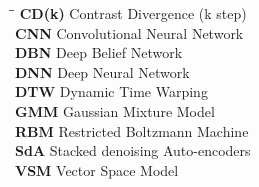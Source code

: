 \abbreviations
 
\noindent 
\begin{tabbing}
\hspace*{4cm}\=\hspace*{6cm}\= \kill
\textbf{CD(k)} \> Contrast Divergence (k step)\\
\textbf{CNN}   \> Convolutional Neural Network \\
\textbf{DBN}   \> Deep Belief Network \\
\textbf{DNN}   \> Deep Neural Network \\
\textbf{DTW}   \> Dynamic Time Warping \\
\textbf{GMM}   \> Gaussian Mixture Model\\
\textbf{RBM}   \> Restricted Boltzmann Machine\\
\textbf{SdA}   \> Stacked denoising Auto-encoders\\
\textbf{VSM}   \> Vector Space Model\\

\end{tabbing}

\pagebreak

